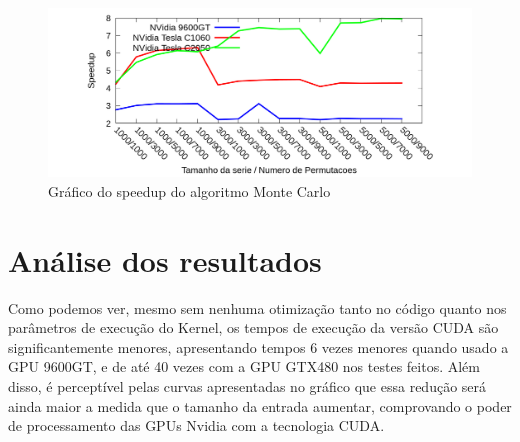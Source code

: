 \begin{figure}[H]
\centering
\includegraphics[width=1.0\textwidth]{Imagens/graficos_mcarlo/mcarlo_speedup_cuda.png}
\caption{Gráfico do speedup do algoritmo Monte Carlo}
\label{fig:grafico_speedup_mcarlo_cuda}
\end{figure}

\section{Análise dos resultados}

Como podemos ver, mesmo sem nenhuma otimização tanto no código quanto nos parâmetros de execução do Kernel, os tempos de execução da versão CUDA são significantemente menores, apresentando tempos 6 vezes menores quando usado a GPU 9600GT, e de até 40 vezes com a GPU GTX480 nos testes feitos. Além disso, é perceptível pelas curvas apresentadas no gráfico que essa redução será ainda maior a medida que o tamanho da entrada aumentar, comprovando o poder de processamento das GPUs Nvidia com a tecnologia CUDA.